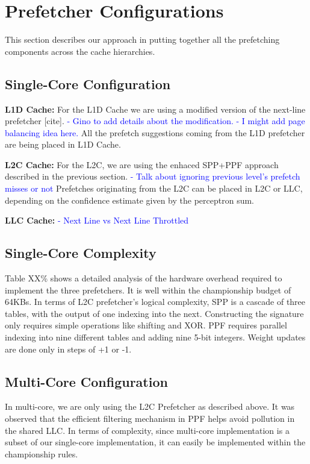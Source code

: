 \section{Prefetcher Configurations}
\label{Config}

This section describes our approach in putting together all the prefetching 
components across the cache hierarchies.

\subsection{Single-Core Configuration}
\label{Config-Single}

\noindent \textbf{L1D Cache:}
For the L1D Cache we are using a modified version of the next-line prefetcher [cite].
\textcolor{blue}{
- Gino to add details about the modification.
- I might add page balancing idea here.
}
All the prefetch suggestions coming from the L1D prefetcher are being placed in L1D Cache.

\noindent \textbf{L2C Cache:}
For the L2C, we are using the enhaced SPP+PPF approach described in the previous section.
\textcolor{blue}{
- Talk about ignoring previous level's prefetch misses or not
}
Prefetches originating from the L2C can be placed in L2C or LLC, depending on the confidence
estimate given by the perceptron sum.

\noindent \textbf{LLC Cache:}
\textcolor{blue}{
- Next Line vs Next Line Throttled
}

\subsection{Single-Core Complexity}
\label{Config-Complex}

Table XX\% shows a detailed analysis of the hardware overhead required to implement the three 
prefetchers. It is well within the championship budget of 64KBs. In terms of L2C prefetcher's logical 
complexity, SPP is a cascade of three tables, with the output of one indexing into the next.
Constructing the signature only requires simple operations like shifting and XOR. PPF requires
parallel indexing into nine different tables and adding nine 5-bit integers. Weight updates are
done only in steps of +1 or -1.


\subsection{Multi-Core Configuration}
\label{Config-Multi}

In multi-core, we are only using the L2C Prefetcher as described above. It was observed that
the efficient filtering mechanism in PPF helps avoid pollution in the shared LLC. In terms of
complexity, since multi-core implementation is a subset of our single-core implementation, 
it can easily be implemented within the championship rules.
